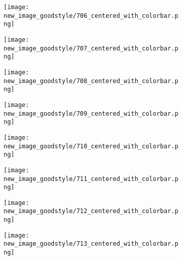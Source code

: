 \documentclass[a4paper,12pt]{article}
\begin{document}
\begin{figure}[H]
  \begin{subfigure}{0.11\textwidth}
    \texttt{[image: new\_image\_goodstyle/706\_centered\_with\_colorbar.png]}
  \end{subfigure}
  \hfill
  \begin{subfigure}{0.11\textwidth}
    \texttt{[image: new\_image\_goodstyle/707\_centered\_with\_colorbar.png]}
  \end{subfigure}
  \hfill
  \begin{subfigure}{0.11\textwidth}
    \texttt{[image: new\_image\_goodstyle/708\_centered\_with\_colorbar.png]}
  \end{subfigure}
  \hfill
  \begin{subfigure}{0.11\textwidth}
    \texttt{[image: new\_image\_goodstyle/709\_centered\_with\_colorbar.png]}
  \end{subfigure}
  \hfill
  \begin{subfigure}{0.11\textwidth}
    \texttt{[image: new\_image\_goodstyle/710\_centered\_with\_colorbar.png]}
  \end{subfigure}
  \hfill
  \begin{subfigure}{0.11\textwidth}
    \texttt{[image: new\_image\_goodstyle/711\_centered\_with\_colorbar.png]}
  \end{subfigure}
  \hfill
  \begin{subfigure}{0.11\textwidth}
    \texttt{[image: new\_image\_goodstyle/712\_centered\_with\_colorbar.png]}
  \end{subfigure}
  \hfill
  \begin{subfigure}{0.11\textwidth}
    \texttt{[image: new\_image\_goodstyle/713\_centered\_with\_colorbar.png]}
  \end{subfigure}
  \hfill
\end{figure}
\end{document}

